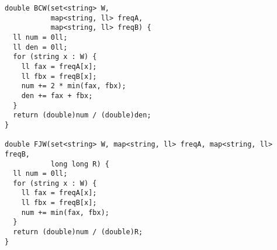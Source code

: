\begin{lstlisting}
double BCW(set<string> W, 
           map<string, ll> freqA, 
           map<string, ll> freqB) {
  ll num = 0ll;
  ll den = 0ll;
  for (string x : W) {
    ll fax = freqA[x];
    ll fbx = freqB[x];
    num += 2 * min(fax, fbx);
    den += fax + fbx;
  }
  return (double)num / (double)den;
}

double FJW(set<string> W, map<string, ll> freqA, map<string, ll> freqB,
           long long R) {
  ll num = 0ll;
  for (string x : W) {
    ll fax = freqA[x];
    ll fbx = freqB[x];
    num += min(fax, fbx);
  }
  return (double)num / (double)R;
}
\end{lstlisting}


